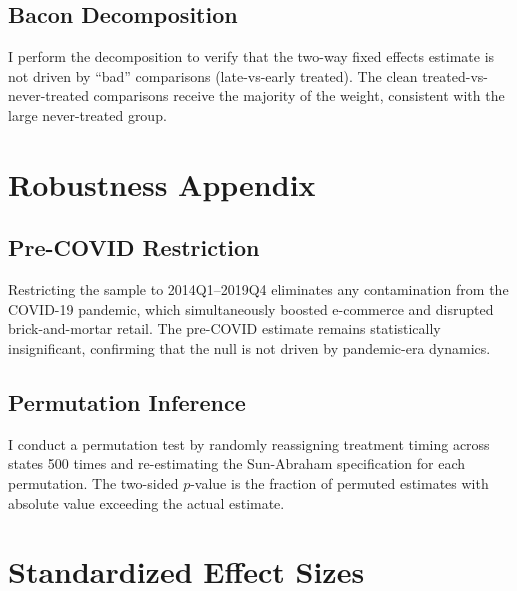 \documentclass[12pt]{article}
\begin{document}
\subsection{Bacon Decomposition}

I perform the \citet{goodman-bacon2021} decomposition to verify that the two-way fixed effects estimate is not driven by ``bad'' comparisons (late-vs-early treated). The clean treated-vs-never-treated comparisons receive the majority of the weight, consistent with the large never-treated group.


\section{Robustness Appendix}

\subsection{Pre-COVID Restriction}

Restricting the sample to 2014Q1--2019Q4 eliminates any contamination from the COVID-19 pandemic, which simultaneously boosted e-commerce and disrupted brick-and-mortar retail. The pre-COVID estimate remains statistically insignificant, confirming that the null is not driven by pandemic-era dynamics.

\subsection{Permutation Inference}

I conduct a permutation test by randomly reassigning treatment timing across states 500 times and re-estimating the Sun-Abraham specification for each permutation. The two-sided $p$-value is the fraction of permuted estimates with absolute value exceeding the actual estimate.


\section{Standardized Effect Sizes}
\label{sec:sde}


\end{document}
